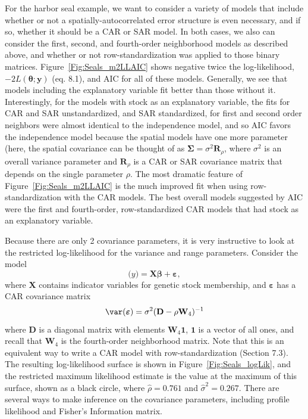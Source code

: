 \documentclass[12pt, titlepage]{article}
\begin{document}
For the harbor seal example, we want to consider a variety of models that include whether or not a spatially-autocorrelated error structure is even necessary, and if so, whether it should be a CAR or SAR model.  In both cases, we also can consider the first, second, and fourth-order neighborhood models as described above, and whether or not row-standardization was applied to those binary matrices. Figure~\ref{Fig:Seals_m2LLAIC} shows negative twice the log-likelihood, $-2L(\boldsymbol{\theta};\mathbf{y})$ (eq. 8.1), and AIC for all of these models.  Generally, we see that models including the explanatory variable fit better than those without it.  Interestingly, for the models with stock as an explanatory variable, the fits for CAR and SAR unstandardized, and SAR standardized, for first and second order neighbors were almost identical to the independence model, and so AIC favors the independence model because the spatial models have one more parameter (here, the spatial covariance can be thought of as $\boldsymbol{\Sigma} = \sigma^{2}\mathbf{R}_{\rho}$, where $\sigma^{2}$ is an overall variance parameter and $\mathbf{R}_{\rho}$ is a CAR or SAR covariance matrix that depends on the single parameter $\rho$.  The most dramatic feature of Figure~\ref{Fig:Seals_m2LLAIC} is the much improved fit when using row-standardization with the CAR models.  The best overall models suggested by AIC were the first and fourth-order, row-standardized CAR models that had stock as an explanatory variable.

Because there are only 2 covariance parameters, it is very instructive to look at the restricted log-likelihood for the variance and range parameters.  Consider the model
\begin{equation} \label{eq:seals_splm}
\mathbf(y) = \mathbf{X}\boldsymbol{\beta} + \boldsymbol{\varepsilon},
\end{equation}
where $\mathbf{X}$ contains indicator variables for genetic stock membership, and $\boldsymbol{\varepsilon}$ has a CAR covariance matrix
$$
\var(\boldsymbol{\varepsilon}) = \sigma^{2}(\mathbf{D} - \rho\mathbf{W}_{4})^{-1}
$$
where $\mathbf{D}$ is a diagonal matrix with elements $\mathbf{W}_{4}\mathbf{1}$, $\mathbf{1}$ is a vector of all ones, and recall that $\mathbf{W}_{4}$ is the fourth-order neighborhood matrix. Note that this is an equivalent way to write a CAR model with row-standardization (Section 7.3). The resulting log-likelihood surface is shown in Figure~\ref{Fig:Seals_logLik}, and the restricted maximum likelihood estimate is the value at the maximum of this surface, shown as a black circle, where $\hat{\rho} = 0.761$ and $\hat{\sigma}^{2} = 0.267$.  There are several ways to make inference on the covariance parameters, including profile likelihood and Fisher's Information matrix.
\end{document}
